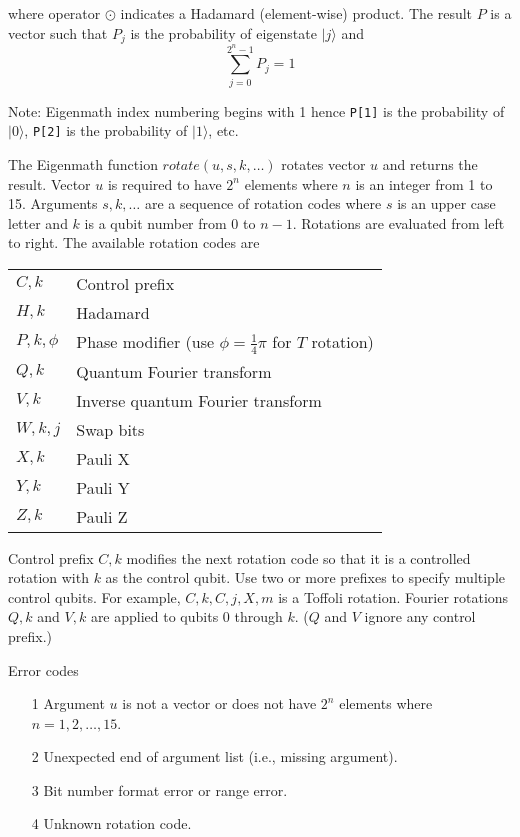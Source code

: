 \noindent
where operator $\odot$ indicates a Hadamard (element-wise) product.
The result $P$ is a vector such that $P_j$ is the
probability of eigenstate $|j\rangle$ and
\begin{equation*}
\sum_{j=0}^{2^n-1} P_j=1
\end{equation*}

\noindent
Note: Eigenmath index numbering begins with 1 hence
\verb$P[1]$ is the probability of $|0\rangle$,
\verb$P[2]$ is the probability of $|1\rangle$, etc.

\bigskip
\noindent
The Eigenmath function
$rotate(u,s,k,\ldots)$
rotates vector $u$ and returns the result.
Vector $u$ is required to have $2^n$ elements where $n$ is an
integer from 1 to 15.
Arguments $s,k,\ldots$ are a sequence of rotation codes
where $s$ is an upper case letter and $k$ is a qubit number
from 0 to $n-1$.
Rotations are evaluated from left to right.
The available rotation codes are

\begin{center}
\begin{tabular}{ll}
$C,k$ & Control prefix
\\
$H,k$ & Hadamard
\\
$P,k,\phi$ & Phase modifier (use $\phi=\tfrac{1}{4}\pi$ for $T$ rotation)
\\
$Q,k$ & Quantum Fourier transform
\\
$V,k$ & Inverse quantum Fourier transform
\\
$W,k,j$ & Swap bits
\\
$X,k$ & Pauli X
\\
$Y,k$ & Pauli Y
\\
$Z,k$ & Pauli Z
\end{tabular}
\end{center}

\noindent
Control prefix $C,k$ modifies the next rotation code so that it
is a controlled rotation with $k$ as the control qubit.
Use two or more prefixes to specify multiple control qubits.
For example, $C,k,C,j,X,m$ is a Toffoli rotation.
Fourier rotations $Q,k$ and $V,k$ are applied to qubits 0 through $k$.
($Q$ and $V$ ignore any control prefix.)

\bigskip
\noindent
Error codes
\begin{itemize}
\item[1] Argument $u$ is not a vector or does not have $2^n$ elements where $n=1,2,\ldots,15$.
\item[2] Unexpected end of argument list (i.e., missing argument).
\item[3] Bit number format error or range error.
\item[4] Unknown rotation code.
\end{itemize}

